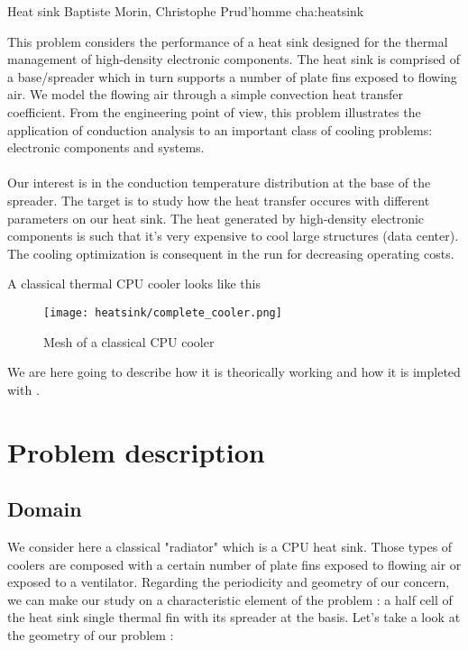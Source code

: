             {Heat sink}
            {Baptiste Morin, Christophe Prud'homme}
            {cha:heatsink}

This problem considers the performance of a heat sink designed for the thermal management of high-density electronic components. The heat sink is comprised of a base/spreader which in turn supports a number of plate fins exposed to flowing air. We model the flowing air through a simple convection heat transfer coefficient. From the engineering point of view, this problem illustrates the application of conduction analysis to an important class of cooling problems: electronic components and systems. \\ \\
Our interest is in the conduction temperature distribution at the base of the spreader. The target is to study how the heat transfer occures with different parameters on our heat sink. The heat generated by high-density electronic components is such that it's very expensive to cool large structures (data center). The cooling optimization is consequent in the run for decreasing operating costs.

\noindent A classical thermal CPU cooler looks like this 

\begin{figure}[!h]
\centering
\texttt{[image: heatsink/complete\_cooler.png]}
\caption{Mesh of a classical CPU cooler}
\end{figure}

\noindent We are here going to describe how it is theorically working and how it is impleted with \feel. 

\section{Problem description}
\subsection{Domain}

We consider here a classical "radiator" which is a CPU heat sink. Those types of coolers are composed with a certain number of plate fins exposed to flowing air or exposed to a ventilator. Regarding the periodicity and geometry of our concern, we can make our study on a characteristic element of the problem : a half cell of the heat sink single thermal fin with its spreader at the basis. Let's take a look at the geometry of our problem :

